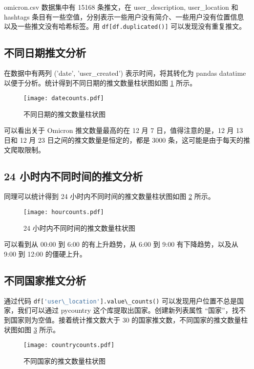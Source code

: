 \documentclass[12pt,AutoFakeBold]{article}
\begin{document}
omicron.csv 数据集中有 15168 条推文，在 user\_description, user\_location 和 hashtags 条目有一些空值，分别表示一些用户没有简介、一些用户没有位置信息以及一些推文没有哈希标签。用 \lstinline[language=Python]|df[df.duplicated()]| 可以发现没有重复推文。

\subsection{不同日期推文分析}

在数据中有两列 ('date', 'user\_created') 表示时间，将其转化为 pandas datatime 以便于分析。统计得到不同日期的推文数量柱状图如图 \ref{fig:datecounts} 所示。

\begin{figure}[htbp]
	\centering
    \texttt{[image: datecounts.pdf]}
    \caption{不同日期的推文数量柱状图} \label{fig:datecounts}
\end{figure}

可以看出关于 Omicron 推文数量最高的在 12 月 7 日，值得注意的是，12 月 13 日和 12 月 23 日之间的推文数量是恒定的，都是 3000 条，这可能是由于每天的推文爬取限制。

\subsection{24 小时内不同时间的推文分析}

同理可以统计得到 24 小时内不同时间的推文数量柱状图如图 \ref{fig:hourcounts} 所示。

\begin{figure}[htbp]
	\centering
    \texttt{[image: hourcounts.pdf]}
    \caption{24 小时内不同时间的推文数量柱状图} \label{fig:hourcounts}
\end{figure}

可以看到从 00:00 到 6:00 的有上升趋势，从 6:00 到 9:00 有下降趋势，以及从 9:00 到 12:00 的僵硬上升。

\subsection{不同国家推文分析}

通过代码 \lstinline[language=Python]|df['user\_location'].value\_counts()| 可以发现用户位置不总是国家，我们可以通过 pycountry 这个库提取出国家。创建新列表属性 “国家”，找不到国家则为空值。接着统计推文数大于 30 的国家推文数，不同国家的推文数量柱状图如图 \ref{fig:countrycounts} 所示。

\begin{figure}[htbp]
	\centering
    \texttt{[image: countrycounts.pdf]}
    \caption{不同国家的推文数量柱状图} \label{fig:countrycounts}
\end{figure}
\end{document}
